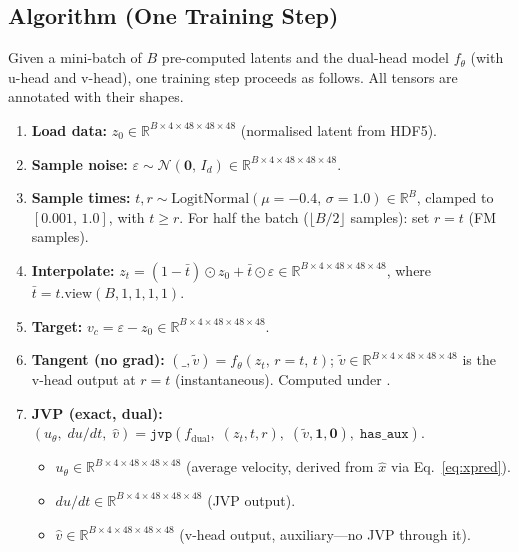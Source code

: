 \subsection{Algorithm (One Training Step)}
\label{sec:algorithm}

Given a mini-batch of $B$ pre-computed latents and the dual-head model
$f_\theta$ (with u-head and v-head), one training step proceeds as follows.
All tensors are annotated with their shapes.

\begin{enumerate}[nosep, leftmargin=2em]
  \item \textbf{Load data:}
    $z_0 \in \mathbb{R}^{B \times 4 \times 48 \times 48 \times 48}$
    (normalised latent from HDF5).

  \item \textbf{Sample noise:}
    $\varepsilon \sim \mathcal{N}(\mathbf{0},\,I_d)
    \in \mathbb{R}^{B \times 4 \times 48 \times 48 \times 48}$.

  \item \textbf{Sample times:}
    $t, r \sim \mathrm{LogitNormal}(\mu{=}{-0.4},\,\sigma{=}1.0)
    \in \mathbb{R}^B$,
    clamped to $[0.001,\,1.0]$, with $t \ge r$.
    For half the batch ($\lfloor B/2 \rfloor$ samples): set $r = t$
    (FM samples).

  \item \textbf{Interpolate:}
    $z_t = (1-\bar{t})\odot z_0 + \bar{t}\odot\varepsilon
    \in \mathbb{R}^{B \times 4 \times 48 \times 48 \times 48}$,
    where $\bar{t} = t.\mathrm{view}(B,1,1,1,1)$.

  \item \textbf{Target:}
    $v_c = \varepsilon - z_0
    \in \mathbb{R}^{B \times 4 \times 48 \times 48 \times 48}$.

  \item \textbf{Tangent (no grad):}
    $(\_, \tilde{v}) = f_\theta(z_t,\,r{=}t,\,t)$;
    $\tilde{v} \in \mathbb{R}^{B \times 4 \times 48 \times 48 \times 48}$
    is the v-head output at $r{=}t$ (instantaneous).
    Computed under .

  \item \textbf{JVP (exact, dual):}
    $(u_\theta,\;du/dt,\;\hat{v}) =
    \texttt{jvp}(f_{\mathrm{dual}},\;(z_t,t,r),\;(\tilde{v},\mathbf{1},\mathbf{0}),\;
    \texttt{has\_aux})$.
    \begin{itemize}[nosep]
      \item $u_\theta \in \mathbb{R}^{B \times 4 \times 48 \times 48 \times 48}$
        (average velocity, derived from $\hat{x}$ via Eq.~\ref{eq:xpred}).
      \item $du/dt \in \mathbb{R}^{B \times 4 \times 48 \times 48 \times 48}$
        (JVP output).
      \item $\hat{v} \in \mathbb{R}^{B \times 4 \times 48 \times 48 \times 48}$
        (v-head output, auxiliary---no JVP through it).
    \end{itemize}


\end{enumerate}
